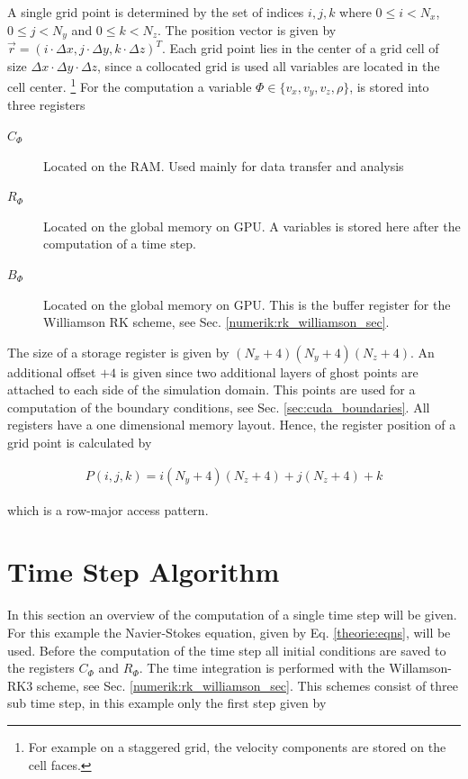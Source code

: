 A single grid point is determined by the set of indices $i,j,k$ where ${0\leq i < N_x}$,
${0\leq j < N_y}$ and ${0\leq k < N_z}$. The position vector is given by ${\vec{r} = (i\cdot\Delta x, j\cdot \Delta y, k\cdot \Delta z)^T}$.
Each grid point lies in the center of a grid cell of size $\Delta x \cdot \Delta y \cdot \Delta z$,
since a collocated grid is used all variables are located in the cell center.
\footnote{For example on a staggered grid, the velocity components are stored on the cell faces.}
For the computation a variable $\Phi\in\{v_x, v_y, v_z, \rho\}$, is stored into three registers

\begin{description}
    \item[$C_\Phi$] Located on the RAM. Used mainly for data transfer and analysis
    \item[$R_\Phi$] Located on the global memory on GPU. A variables is stored here after the computation of a time step.
    \item[$B_\Phi$] Located on the global memory on GPU. This is the buffer register for the Williamson RK scheme, see Sec. \ref{numerik:rk_williamson_sec}.
\end{description}

The size of a storage register is given by $(N_x+4)(N_y+4)(N_z+4)$.
An additional offset $+4$ is given since two additional layers of ghost points are attached to each side of the simulation domain.
This points are used for a computation of the boundary conditions, see Sec. \ref{sec:cuda_boundaries}.
All registers have a one dimensional memory layout.
Hence, the register position of a grid point is calculated by

\begin{align}
    P(i, j, k) = i(N_y+4)(N_z+4)+j(N_z+4)+k
\end{align}

which is a row-major access pattern.

\section{Time Step Algorithm}

In this section an overview of the computation of a single time step will be given.
For this example the Navier-Stokes equation, given by Eq. \ref{theorie:eqns}, will be used.
Before the computation of the time step all initial conditions are saved to the
registers $C_{\Phi}$ and  $R_{\Phi}$.
The time integration is performed with the Willamson-RK3 scheme, see Sec. \ref{numerik:rk_williamson_sec}.
This schemes consist of three sub time step, in this example only the first step given by

